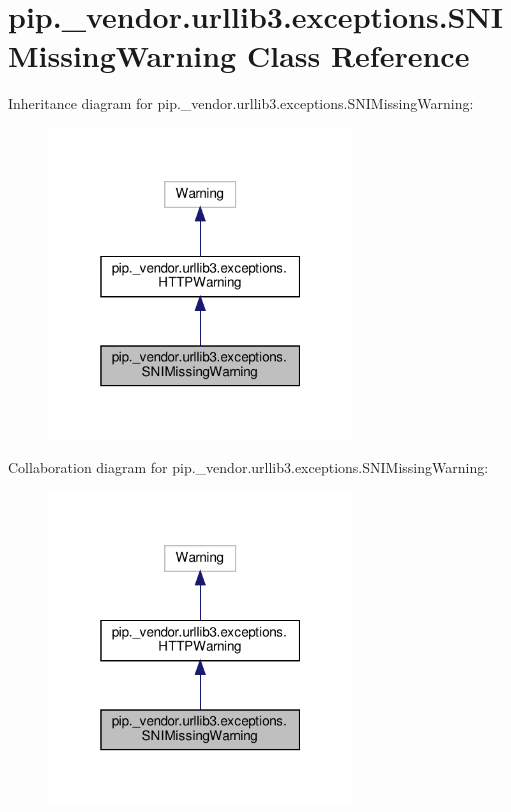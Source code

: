 \hypertarget{classpip_1_1__vendor_1_1urllib3_1_1exceptions_1_1SNIMissingWarning}{}\section{pip.\+\_\+vendor.\+urllib3.\+exceptions.\+S\+N\+I\+Missing\+Warning Class Reference}
\label{classpip_1_1__vendor_1_1urllib3_1_1exceptions_1_1SNIMissingWarning}


Inheritance diagram for pip.\+\_\+vendor.\+urllib3.\+exceptions.\+S\+N\+I\+Missing\+Warning\+:
\nopagebreak
\begin{figure}[H]
\begin{center}
\leavevmode
\includegraphics[width=229pt]{classpip_1_1__vendor_1_1urllib3_1_1exceptions_1_1SNIMissingWarning__inherit__graph}
\end{center}
\end{figure}


Collaboration diagram for pip.\+\_\+vendor.\+urllib3.\+exceptions.\+S\+N\+I\+Missing\+Warning\+:
\nopagebreak
\begin{figure}[H]
\begin{center}
\leavevmode
\includegraphics[width=229pt]{classpip_1_1__vendor_1_1urllib3_1_1exceptions_1_1SNIMissingWarning__coll__graph}
\end{center}
\end{figure}


